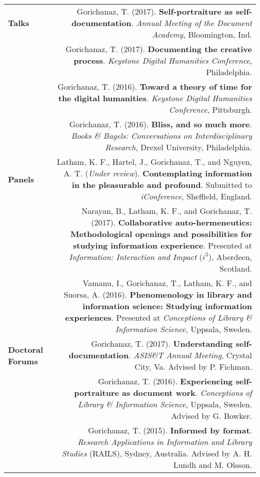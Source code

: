 \documentclass[letterpaper,11pt]{article}
\begin{document}
\begin{longtable}{ @{} L @{} R @{} }

\textbf{Talks}

&	Gorichanaz, T. (2017). \textbf{Self-portraiture as self-documentation}. \emph{Annual Meeting of the Document Academy}, Bloomington, Ind.  \\[1em]

&	Gorichanaz, T. (2017). \textbf{Documenting the creative process}. \emph{Keystone Digital Humanities Conference}, Philadelphia. \\[1em]

&	Gorichanaz, T. (2016). \textbf{Toward a theory of time for the digital humanities}. \emph{Keystone Digital Humanities Conference}, Pittsburgh. \\[1em]

&	Gorichanaz, T. (2016). \textbf{Bliss, and so much more}. \emph{Books \& Bagels: Conversations on Interdisciplinary Research}, Drexel University, Philadelphia.  \\[1em]

\textbf{Panels}

&	Latham, K. F., Hartel, J., Gorichanaz, T., and Nguyen, A. T. (\emph{Under review}). \textbf{Contemplating information in the pleasurable and profound}. Submitted to \emph{iConference}, Sheffield, England. \\[1em]

&	Narayan, B., Latham, K. F., and Gorichanaz, T. (2017). \textbf{Collaborative auto-hermeneutics: Methodological openings and possibilities for studying information experience}. Presented at \emph{Information: Interaction and Impact} ($i^3$), Aberdeen, Scotland. \\[1em]

&	Vamanu, I., Gorichanaz, T., Latham, K. F., and Suorsa, A. (2016). \textbf{Phenomenology in library and information science: Studying information experiences}. Presented at \emph{Conceptions of Library \& Information Science}, Uppsala, Sweden. \\[1em]

\textbf{Doctoral Forums}

&	Gorichanaz, T. (2017). \textbf{Understanding self-documentation}. \emph{ASIS\&T Annual Meeting}, Crystal City, Va. Advised by P. Fichman. \\[1em]

&	Gorichanaz, T. (2016). \textbf{Experiencing self-portraiture as document work}. \emph{Conceptions of Library \& Information Science}, Uppsala, Sweden. Advised by G. Bowker. \\[1em]

&	Gorichanaz, T. (2015). \textbf{Informed by format}. \emph{Research Applications in Information and Library Studies} (RAILS), Sydney, Australia. Advised by A. H. Lundh and M. Olsson. 
	
\end{longtable}
\end{document}
